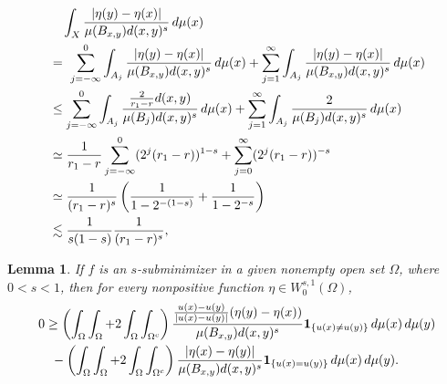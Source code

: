 \documentclass[10pt,a4paper]{amsart}
\newtheorem{lemma}{Lemma}
\begin{document}
		\begin{align}
			&\quad \int_{X}  \frac{  |\eta(y)-\eta(x)|}{\mu(B_{x,y}) d(x,y)^s}  \,d\mu(x)\notag \\
			&= \ \sum_{j=-\infty}^0 \int_{A_j} \frac{  |\eta(y)-\eta(x)|}{\mu(B_{x,y}) d(x,y)^s}  \,d\mu(x) + \sum_{j=1}^\infty \int_{A_j} \frac{  |\eta(y)-\eta(x)|}{\mu(B_{x,y}) d(x,y)^s}  \,d\mu(x) \notag \\
			&\leq   \sum_{j=-\infty}^0 \int_{A_j} \frac{ \frac{2}{r_1-r}d(x,y) }{\mu(B_j) d(x,y)^s}  \,d\mu(x) +  \sum_{j=1}^\infty \int_{A_j} \frac{2}{\mu(B_j) d(x,y)^s}  \,d\mu(x) \notag \\
			&\simeq    \frac{1}{r_1-r}  \sum_{j=-\infty}^0 (2^{j}(r_1-r))^{1-s} +  \sum_{j=0}^\infty (2^j(r_1-r))^{-s}\notag \\
			&\simeq    \frac{1}{(r_1-r)^s} \left( \frac{1}{1-2^{-(1-s)}} + \frac{1}{1-2^{-s}} \right)\notag \\
			&\lesssim \frac{1}{s(1-s)}\frac{1}{(r_1-r)^s}, \label{eq2.6-29oct}
		\end{align}

	\begin{lemma}\label{lem1.3-1oct}
		If $f$ is an $s$-subminimizer 
		{in a given nonempty open set $\Omega$,}
		where $0<s<1$, then
		for every nonpositive  function  $\eta\in W^{s,1}_0(\Omega)$,
		{
			\begin{align*}
				&0\geq  \left( \int_\Omega\int_\Omega +2\int_\Omega\int_{\Omega^c} \right) \frac{ \frac{u(x)-u(y)}{|u(x)-u(y)|} (\eta(y)-\eta(x)) }{\mu(B_{x,y}) d(x,y)^s} 
				{\bf 1}_{\{ u(x)\neq u(y)\}} \,d\mu(x)\,d\mu(y)\\
				&\quad  - \left( \int_\Omega\int_\Omega +2\int_\Omega\int_{\Omega^c} \right) \frac{  |\eta(x)-\eta(y)| }{\mu(B_{x,y}) d(x,y)^s} {\bf 1}_{\{ u(x)= u(y)\}} \,d\mu(x)\,d\mu(y).
			\end{align*}
		}
		
	\end{lemma}
\end{document}
